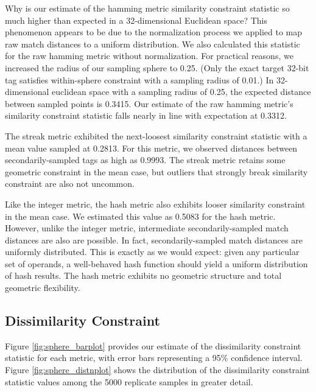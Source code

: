 Why is our estimate of the hamming metric similarity constraint statistic so much higher than expected in a 32-dimensional Euclidean space?
This phenomenon appears to be due to the normalization process we applied to map raw match distances to a uniform distribution.
We also calculated this statistic for the raw hamming metric without normalization.
For practical reasons, we increased the radius of our sampling sphere to 0.25.
(Only the exact target 32-bit tag satisfies within-sphere constraint with a sampling radius of 0.01.)
In 32-dimensional euclidean space with a sampling radius of 0.25, the expected distance between sampled points is 0.3415.
Our estimate of the raw hamming metric's similarity constraint statistic falls nearly in line with expectation at 0.3312.

The streak metric exhibited the next-loosest similarity constraint statistic with a mean value sampled at 0.2813.
For this metric, we observed distances between secondarily-sampled tags as high as 0.9993.
The streak metric retains some geometric constraint in the mean case, but outliers that strongly break similarity constraint are also not uncommon.

Like the integer metric, the hash metric also exhibits looser similarity constraint in the mean case.
We estimated this value as 0.5083 for the hash metric.
However, unlike the integer metric, intermediate secondarily-sampled match distances are also are possible.
In fact, secondarily-sampled match distances are uniformly distributed.
This is exactly as we would expect:
given any particular set of operands, a well-behaved hash function should yield a uniform distribution of hash results.
The hash metric exhibits no geometric structure and total geometric flexibility.

\subsection{Dissimilarity Constraint}



Figure \ref{fig:sphere_barplot} provides our estimate of the dissimilarity constraint statistic for each metric, with error bars representing a 95\% confidence interval.
Figure \ref{fig:sphere_distnplot} shows the distribution of the dissimilarity constraint statistic values among the 5000 replicate samples in greater detail.

